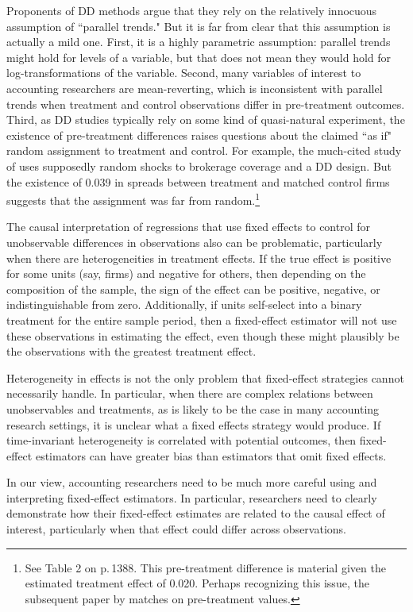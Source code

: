 \documentclass[12pt,reqno,titlepage]{amsart}
\theoremstyle{definition}
\begin{document}
\begin{doublespace}
Proponents of DD methods argue that they rely on the relatively innocuous assumption of ``parallel trends."
But it is far from clear that this assumption is actually a mild one. 
First, it is a highly parametric assumption: parallel trends might hold for levels of a variable, but that does not mean they would hold for log-transformations of the variable.
Second, many variables of interest to accounting researchers are mean-reverting, which is inconsistent with parallel trends when treatment and control observations differ in pre-treatment outcomes.
Third, as DD studies typically rely on some kind of quasi-natural experiment, the existence of pre-treatment differences raises questions about the claimed ``as if" random assignment to treatment and control.
For example, the much-cited study of \cite{Kelly:2012ih} uses supposedly random shocks to brokerage coverage and a DD design.
But the existence of 0.039 in spreads between treatment and matched control firms suggests that the assignment was far from random.\footnote{See Table 2 on p.\,1388. This pre-treatment difference is material given the estimated treatment effect of 0.020. Perhaps recognizing this issue, the subsequent paper by \citet{Balakrishnan:2014js} matches on pre-treatment values.}

The causal interpretation of regressions that use fixed effects to control for unobservable differences in observations also can be problematic, particularly when there are heterogeneities in treatment effects.
If the true effect is positive for some units (say, firms) and negative for others, then depending on the composition of the sample, the sign of the effect can be positive, negative, or indistinguishable from zero.
Additionally, if units self-select into a binary treatment for the entire sample period, then a fixed-effect estimator will not use these observations in estimating the effect, even though these might plausibly be the observations with the greatest treatment effect.

Heterogeneity in effects is not the only problem that fixed-effect strategies cannot necessarily handle. 
In particular, when there are complex relations between unobservables and treatments, as is likely to be the case in many accounting research settings, it is unclear what a fixed effects strategy would produce.
If time-invariant heterogeneity is correlated with potential outcomes, then fixed-effect estimators can have greater bias than estimators that omit fixed effects.

In our view, accounting researchers need to be much more careful using and interpreting fixed-effect estimators. 
In particular, researchers need to clearly demonstrate how their fixed-effect estimates are related to the causal effect of interest, particularly when that effect could differ across observations.


\end{doublespace}
\end{document}

